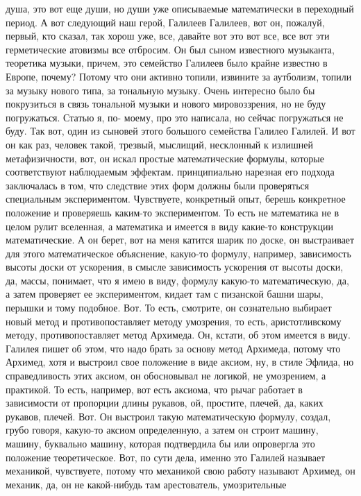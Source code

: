 душа, это вот еще души, но души уже описываемые математически в переходный
период. А вот следующий наш герой, Галилеев Галилеев, вот он, пожалуй, первый,
кто сказал, так хорош уже, все, давайте вот это вот все, все вот эти
герметические атовизмы все отбросим. Он был сыном известного музыканта,
теоретика музыки, причем, это семейство Галилеев было крайне известно в Европе,
почему? Потому что они активно топили, извините за аутболизм, топили за музыку
нового типа, за тональную музыку. Очень интересно было бы покрузиться в связь
тональной музыки и нового мировоззрения, но не буду погружаться. Статью я, по-
моему, про это написала, но сейчас погружаться не буду. Так вот, один из сыновей
этого большого семейства Галилео Галилей. И вот он как раз, человек такой,
трезвый, мыслищий, несклонный к излишней метафизичности, вот, он искал простые
математические формулы, которые соответствуют наблюдаемым эффектам.
принципиально нарезная его подхода заключалась в том, что следствие этих форм
должны были проверяться специальным экспериментом. Чувствуете, конкретный опыт,
берешь конкретное положение и проверяешь каким-то экспериментом. То есть не
математика не в целом рулит вселенная, а математика и имеется в виду какие-то
конструкции математические. А он берет, вот на меня катится шарик по доске, он
выстраивает для этого математическое объяснение, какую-то формулу, например,
зависимость высоты доски от ускорения, в смысле зависимость ускорения от высоты
доски, да, массы, понимает, что я имею в виду, формулу какую-то математическую,
да, а затем проверяет ее экспериментом, кидает там с пизанской башни шары,
перышки и тому подобное. Вот. То есть, смотрите, он сознательно выбирает новый
метод и противопоставляет методу умозрения, то есть, аристотливскому методу,
противопоставляет метод Архимеда. Он, кстати, об этом имеется в виду. Галилея
пишет об этом, что надо брать за основу метод Архимеда, потому что Архимед, хотя
и выстроил свое положение в виде аксиом, ну, в стиле Эфлида, но справедливость
этих аксиом, он обосновывал не логикой, не умозрением, а практикой. То есть,
например, вот есть аксиома, что рычаг работает в зависимости от пропорции длины
рукавов, ой, простите, плечей, да, каких рукавов, плечей. Вот. Он выстроил такую
математическую формулу, создал, грубо говоря, какую-то аксиом определенную, а
затем он строит машину, машину, буквально машину, которая подтвердила бы или
опровергла это положение теоретическое. Вот, по сути дела, именно это Галилей
называет механикой, чувствуете, потому что механикой свою работу называют
Архимед, он механик, да, он не какой-нибудь там арестователь, умозрительные
